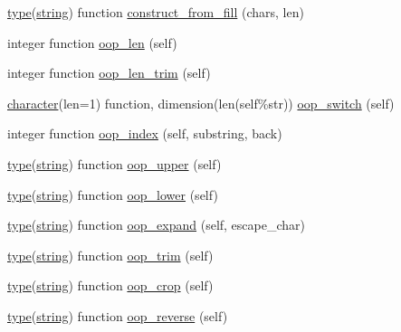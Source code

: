 \begin{DoxyCompactItemize}
\item 
\hyperlink{stop__watch_83_8txt_a70f0ead91c32e25323c03265aa302c1c}{type}(\hyperlink{structm__strings__oop_1_1string}{string}) function \hyperlink{namespacem__strings__oop_a411874cce2f16fee4d05d7528b510703}{construct\+\_\+from\+\_\+fill} (chars, len)
\item 
integer function \hyperlink{namespacem__strings__oop_a768ea13372aadbeae760c72d0b2a1939}{oop\+\_\+len} (self)
\item 
integer function \hyperlink{namespacem__strings__oop_a1b9bf3c6aac71ce1782fb3116ffb63f8}{oop\+\_\+len\+\_\+trim} (self)
\item 
\hyperlink{option__stopwatch_83_8txt_abd4b21fbbd175834027b5224bfe97e66}{character}(len=1) function, dimension(len(self\%str)) \hyperlink{namespacem__strings__oop_a31be80e67fa4829b5ac48c530bd58b7b}{oop\+\_\+switch} (self)
\item 
integer function \hyperlink{namespacem__strings__oop_aafe02b26ccba21eb8a35e9fa99d6c790}{oop\+\_\+index} (self, substring, back)
\item 
\hyperlink{stop__watch_83_8txt_a70f0ead91c32e25323c03265aa302c1c}{type}(\hyperlink{structm__strings__oop_1_1string}{string}) function \hyperlink{namespacem__strings__oop_a9f4030a1ab2c7e2aa71b9d1f2754e67e}{oop\+\_\+upper} (self)
\item 
\hyperlink{stop__watch_83_8txt_a70f0ead91c32e25323c03265aa302c1c}{type}(\hyperlink{structm__strings__oop_1_1string}{string}) function \hyperlink{namespacem__strings__oop_ad49fed83544ede7b94948dee326ca3d7}{oop\+\_\+lower} (self)
\item 
\hyperlink{stop__watch_83_8txt_a70f0ead91c32e25323c03265aa302c1c}{type}(\hyperlink{structm__strings__oop_1_1string}{string}) function \hyperlink{namespacem__strings__oop_a5b96d2a6f242a096cd5788cf0802e825}{oop\+\_\+expand} (self, escape\+\_\+char)
\item 
\hyperlink{stop__watch_83_8txt_a70f0ead91c32e25323c03265aa302c1c}{type}(\hyperlink{structm__strings__oop_1_1string}{string}) function \hyperlink{namespacem__strings__oop_ab9238801d6c3af2fe7ee81c8d2c514ff}{oop\+\_\+trim} (self)
\item 
\hyperlink{stop__watch_83_8txt_a70f0ead91c32e25323c03265aa302c1c}{type}(\hyperlink{structm__strings__oop_1_1string}{string}) function \hyperlink{namespacem__strings__oop_aa1a395d359592720a842054fd0aaff0a}{oop\+\_\+crop} (self)
\item 
\hyperlink{stop__watch_83_8txt_a70f0ead91c32e25323c03265aa302c1c}{type}(\hyperlink{structm__strings__oop_1_1string}{string}) function \hyperlink{namespacem__strings__oop_ac3ab62e14d0b8445f51e084b810e2f76}{oop\+\_\+reverse} (self)

\end{DoxyCompactItemize}
